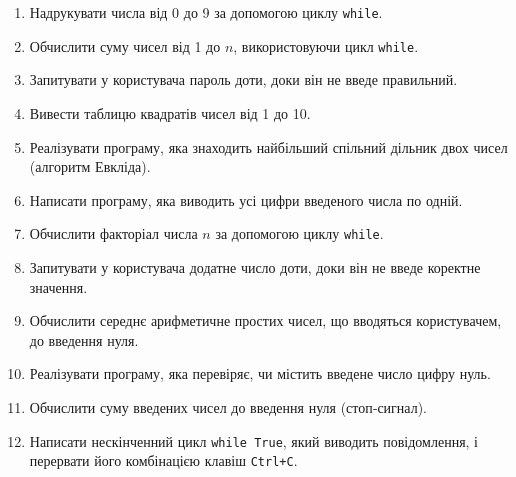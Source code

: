 \begin{enumerate}
	\item Надрукувати числа від 0 до 9 за допомогою циклу \texttt{while}.
	\item Обчислити суму чисел від 1 до $n$, використовуючи цикл \texttt{while}.
	\item Запитувати у користувача пароль доти, доки він не введе правильний.
	\item Вивести таблицю квадратів чисел від 1 до 10.
	\item Реалізувати програму, яка знаходить найбільший спільний дільник двох чисел (алгоритм Евкліда).
	\item Написати програму, яка виводить усі цифри введеного числа по одній.
	\item Обчислити факторіал числа $n$ за допомогою циклу \texttt{while}.
	\item Запитувати у користувача додатне число доти, доки він не введе коректне значення.
	\item Обчислити середнє арифметичне простих чисел, що вводяться користувачем, до введення нуля.
	\item Реалізувати програму, яка перевіряє, чи містить введене число цифру нуль.
	\item Обчислити суму введених чисел до введення нуля (стоп‑сигнал).
	\item Написати нескінченний цикл \texttt{while True}, який виводить повідомлення, і перервати його комбінацією клавіш \texttt{Ctrl+C}.
\end{enumerate}


